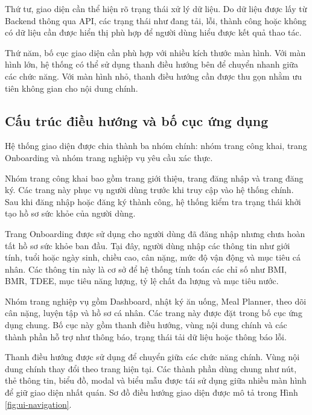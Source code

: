 \documentclass[12pt, a4paper]{report}
\begin{document}
Thứ tư, giao diện cần thể hiện rõ trạng thái xử lý dữ liệu. Do dữ liệu được lấy từ Backend thông qua API, các trạng thái như đang tải, lỗi, thành công hoặc không có dữ liệu cần được hiển thị phù hợp để người dùng hiểu được kết quả thao tác.

Thứ năm, bố cục giao diện cần phù hợp với nhiều kích thước màn hình. Với màn hình lớn, hệ thống có thể sử dụng thanh điều hướng bên để chuyển nhanh giữa các chức năng. Với màn hình nhỏ, thanh điều hướng cần được thu gọn nhằm ưu tiên không gian cho nội dung chính.

\subsection{Cấu trúc điều hướng và bố cục ứng dụng}Hệ thống giao diện được chia thành ba nhóm chính: nhóm trang công khai, trang Onboarding và nhóm trang nghiệp vụ yêu cầu xác thực.

Nhóm trang công khai bao gồm trang giới thiệu, trang đăng nhập và trang đăng ký. Các trang này phục vụ người dùng trước khi truy cập vào hệ thống chính. Sau khi đăng nhập hoặc đăng ký thành công, hệ thống kiểm tra trạng thái khởi tạo hồ sơ sức khỏe của người dùng.

Trang Onboarding được sử dụng cho người dùng đã đăng nhập nhưng chưa hoàn tất hồ sơ sức khỏe ban đầu. Tại đây, người dùng nhập các thông tin như giới tính, tuổi hoặc ngày sinh, chiều cao, cân nặng, mức độ vận động và mục tiêu cá nhân. Các thông tin này là cơ sở để hệ thống tính toán các chỉ số như BMI, BMR, TDEE, mục tiêu năng lượng, tỷ lệ chất đa lượng và mục tiêu nước.

Nhóm trang nghiệp vụ gồm Dashboard, nhật ký ăn uống, Meal Planner, theo dõi cân nặng, luyện tập và hồ sơ cá nhân. Các trang này được đặt trong bố cục ứng dụng chung. Bố cục này gồm thanh điều hướng, vùng nội dung chính và các thành phần hỗ trợ như thông báo, trạng thái tải dữ liệu hoặc thông báo lỗi.

Thanh điều hướng được sử dụng để chuyển giữa các chức năng chính. Vùng nội dung chính thay đổi theo trang hiện tại. Các thành phần dùng chung như nút, thẻ thông tin, biểu đồ, modal và biểu mẫu được tái sử dụng giữa nhiều màn hình để giữ giao diện nhất quán. Sơ đồ điều hướng giao diện được mô tả trong Hình \ref{fig:ui-navigation}.
\end{document}
